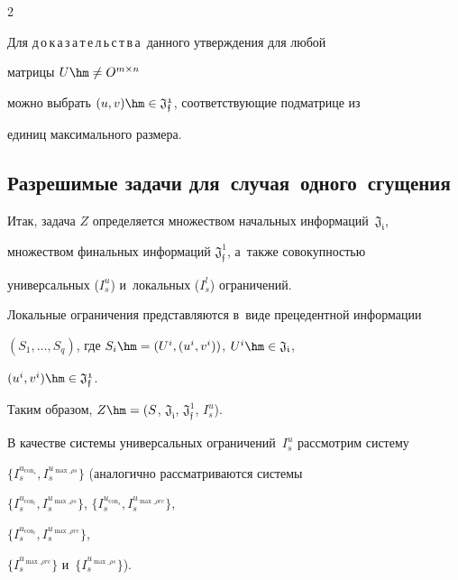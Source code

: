 \begin{multicols}{2}
\smallskip





\noindent


Для д\,о\,к\,а\,з\,а\,т\,е\,л\,ь\,с\,т\,в\,а\ данного утверждения для любой 


матрицы $U\hm\ne O^{m\times n}$ 


можно выбрать $(u,v) \hm\in \mathfrak{J_{f}^1}$, соответствующие подматрице из 


единиц максимального размера.








\subsection{Разрешимые  задачи для~случая~одного~сгущения}





Итак, задача $Z$ определяется множеством начальных информаций~$\mathfrak{J_i}$, 


множеством финальных информаций $\mathfrak{J_{f}^1}$, а~также совокупностью 


универсальных ($I_s^u$) и~локальных ($I_s^l$) ограничений.


Локальные ограничения представляются в~виде прецедентной информации  


$(S_1,\ldots,S_q)$, где $S_i \hm= (U^i , (u^i, v^i))$, $U^i \hm\in \mathfrak{J_i}$, 


$(u^i, v^i) \hm\in \mathfrak{J_{f}^1}$.





Таким образом, $Z \hm= (S$, $\mathfrak{J_i}$, $\mathfrak{J_f^1}$, $I_s^u$).





В качестве системы универсальных ограничений~$I_s^u$ рассмотрим систему 


$\{I_s^{u_{\mathrm{con}_s}}, I_s^{u_{\max\_\rho s}}\}$ (аналогично рассматриваются системы 


$\{I_s^{u_{\mathrm{con}_l}}, I_s^{u_{\max\_\rho s}}\}$, $\{I_s^{u_{\mathrm{con}_s}}, 


I_s^{u_{\max\_\rho rc}}\}$, 


$\{I_s^{u_{\mathrm{con}_l}}, I_s^{u_{\max\_\rho rc}}\}$,


$\{I_s^{u_{\max\_\rho rc}}\}$ и~$\{I_s^{u_{\max\_\rho s}}\}$).






\end{multicols}

